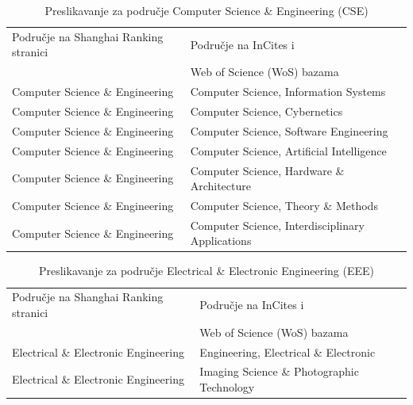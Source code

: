 \documentclass[times, utf8, zavrsni]{fer}
\begin{document}
\begin{table}[htb]
    \caption{Preslikavanje za područje Computer Science \& Engineering (CSE)}
    \label{tbl:konstante}
    \centering
    \begin{tabular}{ll} \hline
    Područje na Shanghai Ranking stranici & Područje na InCites i \\ & Web of Science (WoS) bazama\\ \hline
    Computer Science \& Engineering & Computer Science, Information Systems \\
    Computer Science \& Engineering & Computer Science, Cybernetics \\
    Computer Science \& Engineering & Computer Science, Software Engineering \\
    Computer Science \& Engineering & Computer Science, Artificial Intelligence \\
    Computer Science \& Engineering & Computer Science, Hardware \& Architecture \\
    Computer Science \& Engineering & Computer Science, Theory \& Methods \\
    Computer Science \& Engineering & Computer Science, Interdisciplinary Applications \\
    \end{tabular}
    \end{table}
    \FloatBarrier
    \hfil

\begin{table}[htb]
    \caption{Preslikavanje za područje Electrical \& Electronic Engineering (EEE)}
        \label{tbl:konstante1}
        \centering
        \begin{tabular}{ll} \hline
        Područje na Shanghai Ranking stranici & Područje na InCites i \\ & Web of Science (WoS) bazama\\ \hline
        Electrical \& Electronic Engineering &  Engineering, Electrical \& Electronic\\
        Electrical \& Electronic Engineering &  Imaging Science \& Photographic Technology\\
        \end{tabular}
        \end{table}    
        \FloatBarrier
\end{document}
